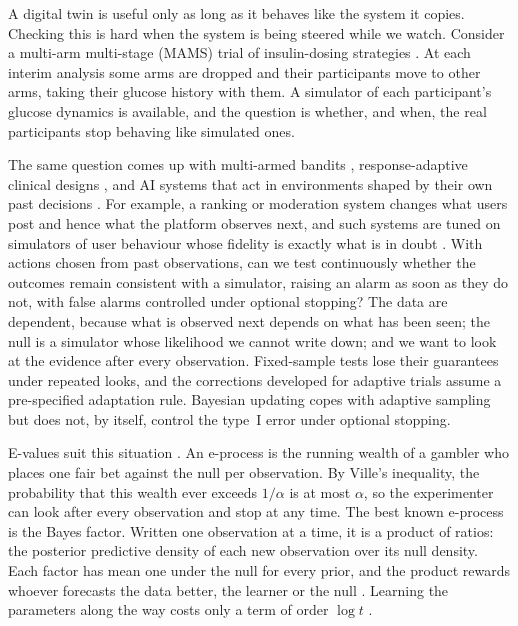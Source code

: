 \documentclass[12pt]{article}
\theoremstyle{remark}
\begin{document}
A digital twin is useful only as long as it behaves like the system it
copies. Checking this is hard when the system is being steered while we
watch. Consider a multi-arm multi-stage (MAMS) trial of insulin-dosing
strategies \citep{magirr2012generalized}. At each interim
analysis some arms are dropped and their participants move to other arms,
taking their glucose history with them. A simulator of each participant's
glucose dynamics is available, and the question is whether, and when, the
real participants stop behaving like simulated ones.

The same question comes up with multi-armed bandits
\citep{lattimore2020bandit}, response-adaptive clinical designs
\citep{villar2015multi}, and AI systems that act in
environments shaped by their own past decisions
\citep{perdomo2020performative}. For example, a ranking or moderation system changes what users post and hence
what the platform observes next,
and such systems are tuned on simulators of user behaviour whose fidelity is
exactly what is in doubt \citep{ie2019recsim}. With actions chosen from past observations, can we test continuously whether the outcomes remain consistent with a simulator, raising an alarm as soon as they do not, with false alarms controlled under optional stopping? The data are dependent, because what is observed next depends on
what has been seen; the null is a simulator whose likelihood we
cannot write down; and we want to look at the evidence after
every observation. Fixed-sample tests lose
their guarantees under repeated looks, and the corrections developed for
adaptive trials \citep{magirr2012generalized} assume a
pre-specified adaptation rule. Bayesian updating copes with adaptive sampling
but does not, by itself, control the type~I error under optional stopping.

E-values suit this situation
\citep{vovk2021evalues,ramdas2023game,grunwald2024safe}. An e-process is the
running wealth of a gambler who places one fair bet against the null per
observation. By Ville's inequality, the probability that this wealth ever
exceeds $1/\alpha$ is at most $\alpha$, so the experimenter can look after
every observation and stop at any time. The best known e-process is the Bayes
factor. Written one observation at a time, it is a product of ratios: the
posterior predictive density of each new observation over its null density.
Each factor has mean one under the null for every prior, and the product
rewards whoever forecasts the data better, the learner or the null
\citep{dawid1984present}. Learning the parameters along the way costs only a
term of order $\log t$ \citep{clarke1990information}.
\end{document}
